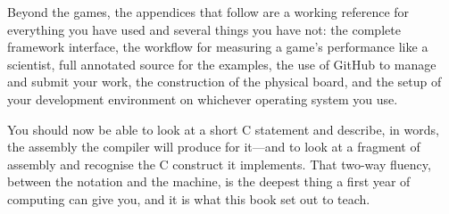 Beyond the games, the appendices that follow are a working reference for everything
you have used and several things you have not: the complete framework interface,
the workflow for measuring a game's performance like a scientist, full annotated
source for the examples, the use of GitHub to manage and submit your work, the
construction of the physical board, and the setup of your development environment
on whichever operating system you use.

\begin{prgcheck}
You should now be able to look at a short C statement and describe, in words, the
assembly the compiler will produce for it---and to look at a fragment of \riscv
assembly and recognise the C construct it implements. That two-way fluency, between
the notation and the machine, is the deepest thing a first year of computing can
give you, and it is what this book set out to teach.
\end{prgcheck}
